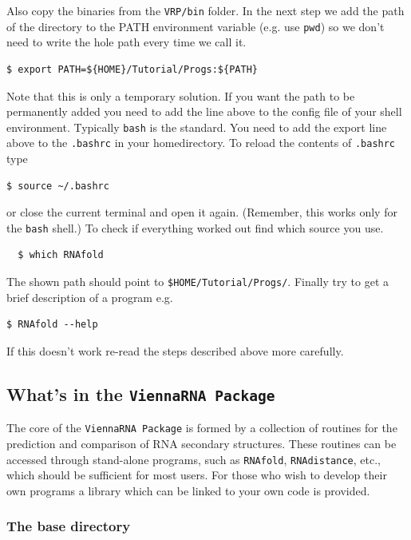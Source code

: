 \documentclass[a4paper]{article}
\newcommand{\frametitle}[1]{\subsubsection{#1}}
\begin{document}
Also copy the binaries from the \texttt{VRP/bin} folder. In the next step we add the path 
of the directory to the PATH environment variable (e.g. use \texttt{pwd}) so we don't need to
write the hole path every time we call it.
\begin{verbatim}
$ export PATH=${HOME}/Tutorial/Progs:${PATH}
\end{verbatim}
%
Note that this is only a temporary solution. If you want the path to be 
permanently added you need to add the line above to the config file of your 
shell environment. Typically \texttt{bash} is the standard. You need to add the export line 
above to the \texttt{.bashrc} in your homedirectory. To reload the contents of \texttt{.bashrc} type
\begin{verbatim}
$ source ~/.bashrc
\end{verbatim}
or close the current terminal and open it again. (Remember, this works only for the \texttt{bash} shell.)
%
To check if everything worked out find which source you use.
%	
\begin{verbatim}
  $ which RNAfold
\end{verbatim}
The shown path should point to \texttt{\$HOME/Tutorial/Progs/}. Finally try to
get a brief description of a program e.g.
%	
\begin{verbatim}
$ RNAfold --help
\end{verbatim}
%
If this doesn't work re-read the steps described above more carefully.

\subsection{What's in the \texttt{ViennaRNA Package}}
The core of the \texttt{ViennaRNA Package} is formed by a collection
of routines for the prediction and comparison of RNA secondary
structures. These routines can be accessed through stand-alone
programs, such as \texttt{RNAfold}, \texttt{RNAdistance}, etc., which
should be sufficient for most users. For those who wish to develop
their own programs a library which can be linked to your own code is
provided.

  \frametitle{The base directory}
\end{document}
